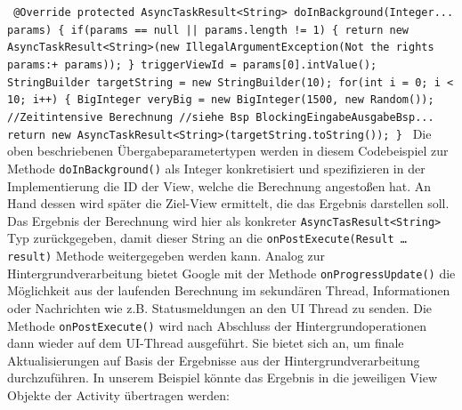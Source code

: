 \documentclass[12pt,oneside,a4paper,bibtotoc,liststotoc]{scrreprt}
\begin{document}
\texttt{
@Override\newline
  protected AsyncTaskResult<String> doInBackground(Integer... params)\newline
  \{\newline
     if(params == null || params.length != 1)\newline
    \{\newline
        return new AsyncTaskResult<String>(new IllegalArgumentException(\grqq Not the rights params:\grqq + params));\newline
    \}\newline
     triggerViewId = params[0].intValue();\newline
\newline
     StringBuilder targetString = new StringBuilder(10);\newline
     for(int i = 0; i < 10; i++)\newline
    \{\newline
\newline
BigInteger veryBig = new BigInteger(1500, new Random());  //Zeitintensive Berechnung \newline
           //siehe Bsp BlockingEingabeAusgabeBsp...\newline
     return new AsyncTaskResult<String>(targetString.toString());\newline
 \}\newline
}\newline
Die oben beschriebenen Übergabeparametertypen werden in diesem Codebeispiel zur Methode \texttt{doInBackground()} als Integer konkretisiert und spezifizieren in der Implementierung die ID der View, welche die Berechnung angestoßen hat. An Hand dessen wird später die Ziel-View ermittelt, die das Ergebnis darstellen soll. Das Ergebnis der Berechnung wird hier als konkreter \texttt{AsyncTasResult<String>} Typ zurückgegeben, damit dieser String an die \texttt{onPostExecute(Result … result)} Methode weitergegeben werden kann. Analog zur Hintergrundverarbeitung bietet Google mit der Methode \texttt{onProgressUpdate()} die Möglichkeit aus der laufenden Berechnung im sekundären Thread, Informationen oder Nachrichten wie z.B. Statusmeldungen an den UI Thread zu senden. Die Methode \texttt{onPostExecute()} wird nach Abschluss der Hintergrundoperationen dann wieder auf dem UI-Thread ausgeführt. Sie bietet sich an, um finale Aktualisierungen auf Basis der Ergebnisse aus der Hintergrundverarbeitung durchzuführen. In unserem Beispiel könnte das Ergebnis in die jeweiligen View Objekte der Activity übertragen werden:\newline
\end{document}
